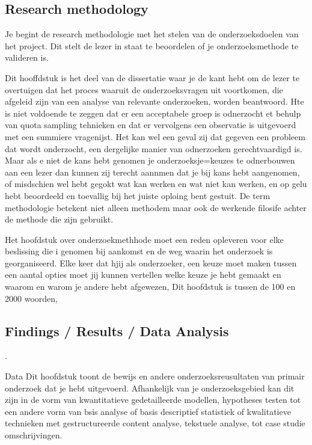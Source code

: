 \subsection{Research methodology}
 
 




Je begint de research methodologie met het stelen van de onderzoeksdoelen van het project. Dit stelt de lezer in staat te beoordelen of je onderzoeksmethode te valideren is.

Dit hooffdstuk is het deel van de dissertatie waar je de kant hebt om de lezer te overtuigen dat het proces waaruit de onderzoeksvragen uit voortkomen, die afgeleid zijn van een analyse van relevante onderzoeken, worden beantwoord. Hte is niet voldoende te zeggen dat er een acceptabele groep is odnerzocht et behulp van quota sampling tehnieken en dat er vervolgens een observatie is uitgevoerd met een summiere vragenijst. Het kan wel een geval zij  dat gegeven een probleem dat wordt onderzocht, een dergelijke manier van odnerzoeken gerechtvaardigd is. Maar als e niet de kans hebt genomen je onderzoeksje=keuzes te odnerbouwen aan een lezer dan kunnen zij terecht aannmen dat je bij kans hebt aangenomen, of misdschien wel hebt gegokt wat kan werken en wat niet kan werken, en op gelu hebt beoordeeld en toevallig bij het juiste oploing bent gestuit.
De term methodologie  betekent niet alleen methodem maar ook de werkende filosife achter de methode die zijn gebruikt.


Het hoofdstuk over onderzoekmethhode moet een reden opleveren voor elke beslissing die i genomen bij aankomst en de weg waarin het onderzoek is georganiseerd. Elke keer dat hjij als onderzoeker, een keuze moet maken tussen een aantal opties moet  jij kunnen vertellen welke keuze je hebt gemaakt en waarom en warom je andere hebt afgewezen, Dit hoofdstuk is tussen de 100 en 2000 woorden,

\subsection{Findings / Results / Data Analysis}
.
 




Data
Dit hoofdstuk toont de bewijs en andere onderzoeksreusultaten van primair onderzoek dat je hebt uitgevoerd. Afhankelijk van je onderzoeksgebied kan dit zijn in de vorm van kwantitatieve gedetailleerde modellen,  hypotheses testen tot een andere vorm van bsis analyse of basis descriptief statistiek of kwalitatieve technieken  met gestructureerde content analyse, tekstuele analyse, tot case studie omschrijvingen.

